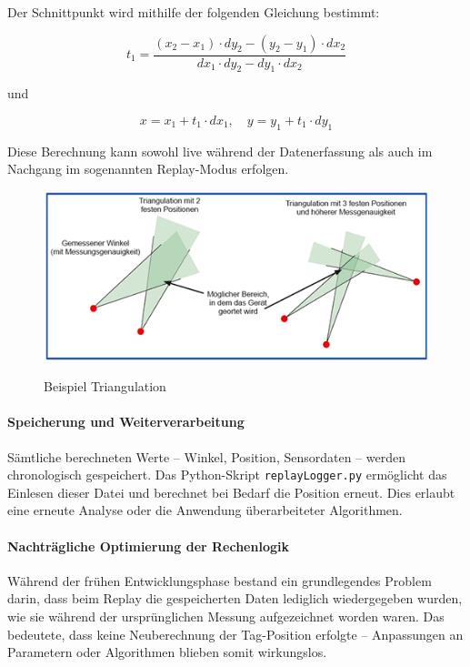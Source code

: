 \documentclass[a4paper, 12pt]{article} %
\begin{document}
Der Schnittpunkt wird mithilfe der folgenden Gleichung bestimmt:

\[
t_1 = \frac{(x_2 - x_1) \cdot dy_2 - (y_2 - y_1) \cdot dx_2}
           {dx_1 \cdot dy_2 - dy_1 \cdot dx_2}
\]

und

\[
x = x_1 + t_1 \cdot dx_1, \quad y = y_1 + t_1 \cdot dy_1
\]

Diese Berechnung kann sowohl live während der Datenerfassung als auch im Nachgang im sogenannten Replay-Modus erfolgen.

\begin{figure}[H]
    \includegraphics[width=1\linewidth]{images/1906_abbildung1 (1)}\\[1ex]
    \centering
    \caption{Beispiel Triangulation}
    \label{ABBILDUNG}
\end{figure}

\paragraph{Speicherung und Weiterverarbeitung}

Sämtliche berechneten Werte – Winkel, Position, Sensordaten – werden chronologisch gespeichert. Das Python-Skript \texttt{replayLogger.py} 
ermöglicht das Einlesen dieser Datei und berechnet bei Bedarf die Position erneut. Dies erlaubt eine erneute Analyse oder die Anwendung überarbeiteter 
Algorithmen.

\paragraph{Nachträgliche Optimierung der Rechenlogik}

Während der frühen Entwicklungsphase bestand ein grundlegendes Problem darin, dass beim Replay die gespeicherten Daten lediglich wiedergegeben wurden, wie sie während der ursprünglichen Messung aufgezeichnet worden waren. Das bedeutete, dass keine Neuberechnung der Tag-Position erfolgte – Anpassungen an Parametern oder Algorithmen blieben somit wirkungslos. 
\end{document}
